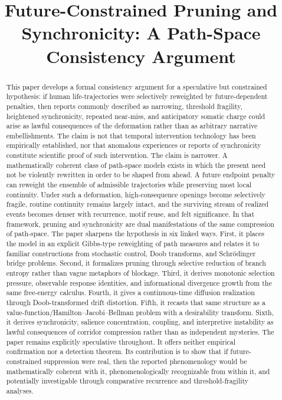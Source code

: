 \documentclass[12pt]{article}
\title{\textbf{Future-Constrained Pruning and Synchronicity: A Path-Space Consistency Argument}}
\author{}
\date{}
\begin{document}
\maketitle

\begin{abstract}
This paper develops a formal consistency argument for a speculative but constrained hypothesis: if human life-trajectories were selectively reweighted by future-dependent penalties, then reports commonly described as narrowing, threshold fragility, heightened synchronicity, repeated near-miss, and anticipatory somatic charge could arise as lawful consequences of the deformation rather than as arbitrary narrative embellishments. The claim is not that temporal intervention technology has been empirically established, nor that anomalous experiences or reports of synchronicity constitute scientific proof of such intervention. The claim is narrower. A mathematically coherent class of path-space models exists in which the present need not be violently rewritten in order to be shaped from ahead. A future endpoint penalty can reweight the ensemble of admissible trajectories while preserving most local continuity. Under such a deformation, high-consequence openings become selectively fragile, routine continuity remains largely intact, and the surviving stream of realized events becomes denser with recurrence, motif reuse, and felt significance. In that framework, pruning and synchronicity are dual manifestations of the same compression of path-space. The paper sharpens the hypothesis in six linked ways. First, it places the model in an explicit Gibbs-type reweighting of path measures and relates it to familiar constructions from stochastic control, Doob transforms, and Schr\"odinger bridge problems. Second, it formalizes pruning through selective reduction of branch entropy rather than vague metaphors of blockage. Third, it derives monotonic selection pressure, observable response identities, and informational divergence growth from the same free-energy calculus. Fourth, it gives a continuous-time diffusion realization through Doob-transformed drift distortion. Fifth, it recasts that same structure as a value-function/Hamilton--Jacobi--Bellman problem with a desirability transform. Sixth, it derives synchronicity, salience concentration, coupling, and interpretive instability as lawful consequences of corridor compression rather than as independent mysteries. The paper remains explicitly speculative throughout. It offers neither empirical confirmation nor a detection theorem. Its contribution is to show that if future-constrained suppression were real, then the reported phenomenology would be mathematically coherent with it, phenomenologically recognizable from within it, and potentially investigable through comparative recurrence and threshold-fragility analyses.
\end{abstract}
\end{document}
